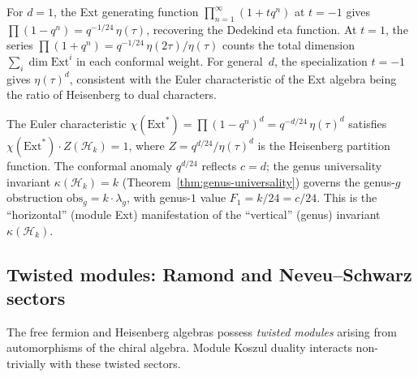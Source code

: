 \begin{remark}
\label{rem:fock-ext-jacobi}
For $d = 1$, the Ext generating function
$\prod_{n=1}^\infty (1 + tq^n)$ at $t = -1$ gives
$\prod(1 - q^n) = q^{-1/24}\,\eta(\tau)$, recovering the
Dedekind eta function.  At $t = 1$, the series
$\prod(1 + q^n) = q^{-1/24}\,\eta(2\tau)/\eta(\tau)$
counts the total dimension $\sum_i \dim \mathrm{Ext}^i$
in each conformal weight.  For general~$d$, the specialization
$t = -1$ gives $\eta(\tau)^d$, consistent with the Euler
characteristic of the Ext algebra being the ratio of Heisenberg
to dual characters.
\end{remark}

\begin{remark}
\label{rem:ext-genus-universality}
The Euler characteristic $\chi(\mathrm{Ext}^*) = \prod(1 - q^n)^d = q^{-d/24}\,\eta(\tau)^d$ satisfies $\chi(\mathrm{Ext}^*) \cdot Z(\mathcal{H}_k) = 1$, where $Z = q^{d/24}/\eta(\tau)^d$ is the Heisenberg partition function.  The conformal anomaly $q^{d/24}$ reflects $c = d$; the genus universality invariant $\kappa(\mathcal{H}_k) = k$ (Theorem~\ref{thm:genus-universality}) governs the genus-$g$ obstruction $\mathrm{obs}_g = k \cdot \lambda_g$, with genus-$1$ value $F_1 = k/24 = c/24$.  This is the ``horizontal'' (module Ext) manifestation of the ``vertical'' (genus) invariant~$\kappa(\mathcal{H}_k)$.
\end{remark}

\subsection{Twisted modules: Ramond and Neveu--Schwarz sectors}
\label{sec:twisted-modules-free-fields}

The free fermion and Heisenberg algebras possess \emph{twisted modules}
arising from automorphisms of the chiral algebra.  Module Koszul duality
interacts non-trivially with these twisted sectors.

